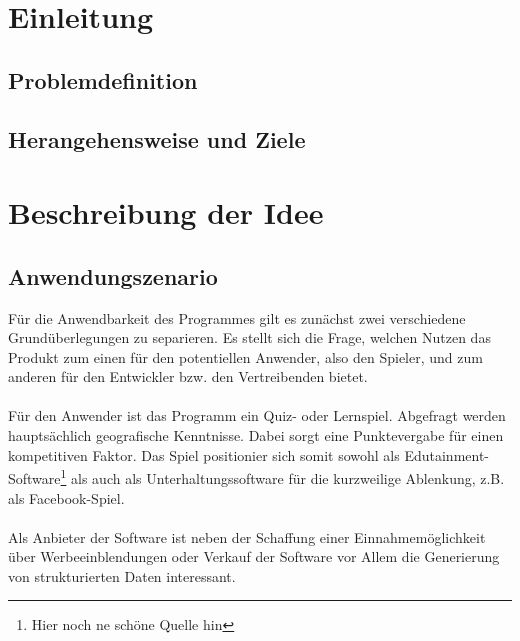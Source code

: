 \documentclass[a4paper, 11pt]{article}
\begin{document}
\tableofcontents
\setcounter{page}{1}
\newpage
\listoffigures
\newpage


\setcounter{page}{1}
\section{Einleitung}
\subsection{Problemdefinition}
\subsection{Herangehensweise und Ziele}
\newpage
\section{Beschreibung der Idee}
\subsection{Anwendungszenario}
Für die Anwendbarkeit des Programmes gilt es zunächst zwei verschiedene Grundüberlegungen zu separieren. Es stellt sich die Frage, welchen Nutzen das Produkt zum einen für den potentiellen Anwender, also den Spieler, und zum anderen für den Entwickler bzw. den Vertreibenden bietet.\\\\Für den Anwender ist das Programm ein Quiz- oder Lernspiel. Abgefragt werden hauptsächlich geografische Kenntnisse. Dabei sorgt eine Punktevergabe für einen kompetitiven Faktor. Das Spiel positionier sich somit sowohl als Edutainment-Software\footnote{Hier noch ne schöne Quelle hin} als auch als Unterhaltungssoftware für die kurzweilige Ablenkung, z.B. als Facebook-Spiel.\\\\Als Anbieter der Software ist neben der Schaffung einer Einnahmemöglichkeit über Werbeeinblendungen oder Verkauf der Software vor Allem die Generierung von strukturierten Daten interessant. 
\end{document}
